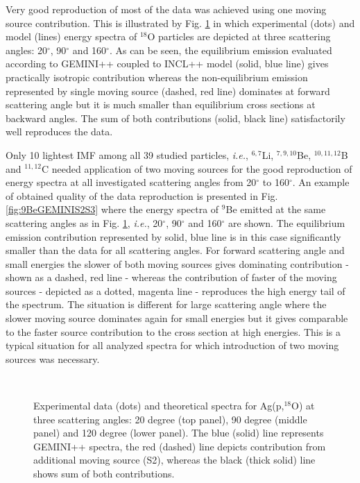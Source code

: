 Very good reproduction of most of the data was achieved using one
moving source contribution. %
This is illustrated by Fig. \ref{fig:18OGEMINIS2} in which
experimental (dots) and model (lines) energy spectra of $^{18}$O
particles are depicted at three scattering angles: 20$^{\circ}$,
90$^{\circ}$ and 160$^{\circ}$.  As can be seen, the equilibrium
emission evaluated according to GEMINI++ \cite{GEMINI++} coupled to
INCL++ \cite{Mancusi2014} model (solid, blue line) gives practically
isotropic contribution whereas the non-equilib\-rium emission
represented by single moving source (dashed, red line) dominates at
forward scattering angle but it is much smaller than equilibrium
cross sections at backward angles. The sum of both contributions
(solid, black line) satisfactorily well reproduces the data.

Only 10 lightest IMF among all 39 studied particles, \emph{i.e.},
$^{6,7}$Li, $^{7,9,10}$Be, $^{10,11,12}$B and $^{11,12}$C needed
application of two moving sources for the good reproduction of
energy spectra at all investigated scattering angles from
20$^{\circ}$ to 160$^{\circ}$.  An example of obtained quality of
the data reproduction is presented in Fig. \ref{fig:9BeGEMINIS2S3}
where the energy spectra of $^9$Be emitted at the same scattering
angles as in Fig. \ref{fig:18OGEMINIS2}, \emph{i.e.},  20$^{\circ}$,
90$^{\circ}$ and 160$^{\circ}$ are shown.  The equilibrium emission
contribution represented by solid, blue line is in this case
significantly smaller than the data for all scattering angles. For
forward scattering angle and small energies the slower of both
moving sources gives dominating contribution - shown as a dashed,
red line - whereas the contribution of faster of the moving sources
- depicted as a dotted, magenta line - reproduces the high energy
tail of the spectrum.  The situation is different for large
scattering angle where the slower moving source dominates again for
small energies but it gives comparable to the faster source
contribution to the cross section at high energies.  This is a
typical situation for all analyzed spectra for which introduction of
two moving sources was necessary.
%
%
\begin{figure}
  \centering
  \\
  \caption{Experimental data (dots) and theoretical spectra for Ag(p,$^{18}$O) at three
  scattering angles: 20 degree (top panel), 90 degree (middle panel) and 120 degree (lower panel).
  The blue (solid) line represents GEMINI++ spectra, the red (dashed) line depicts contribution
  from additional moving source (S2), whereas the black (thick solid) line shows sum of both contributions.}
  \label{fig:18OGEMINIS2}
\end{figure}
%

